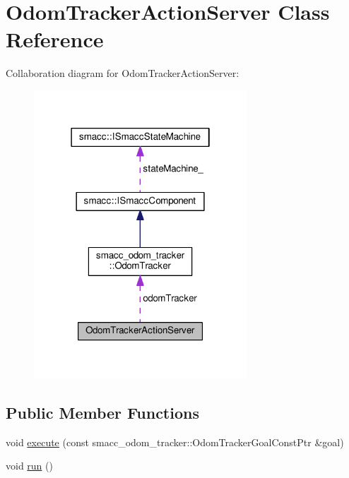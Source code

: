 \hypertarget{classOdomTrackerActionServer}{\section{Odom\-Tracker\-Action\-Server Class Reference}
\label{classOdomTrackerActionServer}
}


Collaboration diagram for Odom\-Tracker\-Action\-Server\-:
\nopagebreak
\begin{figure}[H]
\begin{center}
\leavevmode
\includegraphics[width=226pt]{classOdomTrackerActionServer__coll__graph}
\end{center}
\end{figure}
\subsection*{Public Member Functions}
\begin{DoxyCompactItemize}
\item 
void \hyperlink{classOdomTrackerActionServer_af8a72e60dfa1b6224d5c0a9cc9ae68a8}{execute} (const smacc\-\_\-odom\-\_\-tracker\-::\-Odom\-Tracker\-Goal\-Const\-Ptr \&goal)
\item 
void \hyperlink{classOdomTrackerActionServer_a8ab6984c7383949a048d72437e9f79d3}{run} ()
\end{DoxyCompactItemize}
